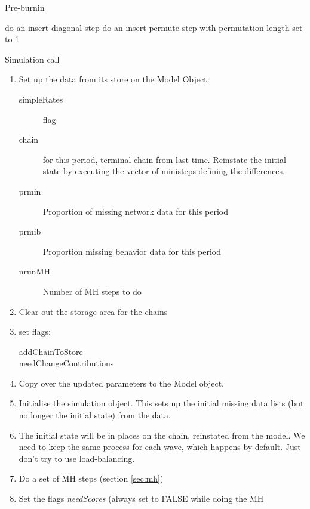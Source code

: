 \documentclass[12pt,a4paper]{article}
\makeatletter
\renewcommand{\=}{\,=\,}
\newcommand{\+}{\,+\,}
\newcommand{\nnm}[1]{\textsf{\small\textit{#1}}}
\renewcommand{\section}{\@startsection{section}{1}
                {0pt}{\baselineskip}{0.5\baselineskip}
                {\centering\sffamily} }
\renewcommand{\subsection}{\@startsection{subsection}{2}
                {0pt}{0.7\baselineskip}{0.3\baselineskip}
                {\sffamily} }
\makeatother
\begin{document}
 \subsection{Pre-burnin}
\label{sec:preburnin}
  \begin{algorithmic}
\REPEAT
\STATE do an insert diagonal step
\REPEAT
\STATE do an insert permute step with permutation length set to 1
  \end{algorithmic}
 \section{Simulation  call}
\begin{enumerate}
\item Set up the data from its store on the Model Object:
\begin{description}
\item[simpleRates] flag
\item[chain] for this period, terminal chain from last time. Reinstate the
  initial state by executing the vector of ministeps defining the differences.
\item[prmin] Proportion of missing network data for this period
\item[prmib] Proportion missing behavior data for this period
\item[nrunMH] Number of MH steps to do
\end{description}
\item Clear out the storage area for the chains
\item set flags:
\begin{description}
\item[addChainToStore]
\item[needChangeContributions]
\end{description}
\item Copy over the updated parameters to the Model object.
\item Initialise the simulation object. This sets up the initial
  missing data lists (but no longer the initial state)
  from the data.
\item The initial state will be in places on the chain, reinstated from the
  model. We need to keep the same process for each wave, which happens by
  default. Just don't try to use load-balancing.
\item Do a set of MH steps (section \ref{sec:mh})
\item Set the flags \nnm{needScores} (always set to FALSE while doing the MH

\end{enumerate}
\end{document}
